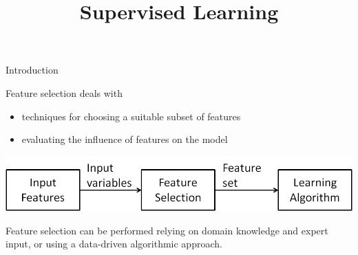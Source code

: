 \documentclass[11pt,compress,t,notes=noshow, xcolor=table]{beamer}
\title{Supervised Learning}
\date{}
\begin{document}

  \begin{vbframe}{Introduction}

    Feature selection deals with
    \begin{itemize}
     \item techniques for choosing a suitable subset of features
      \item evaluating the influence of features on the model
    \end{itemize}
    \vspace{0.5cm}
    \begin{center}
    \includegraphics{figure_man/varsel_overview.png}
    \end{center}

    \lz

    Feature selection can be performed relying on domain knowledge and expert input, or using a data-driven algorithmic approach.
  \end{vbframe}


%
%
\end{document}
